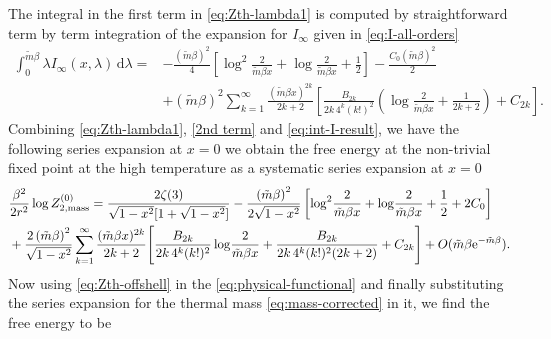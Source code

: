 \documentclass[a4paper,11pt]{article}
\newcommand{\e}{\mathrm e}
\newcommand{\dd}{\mathrm d}
\begin{document}
The integral in the first term in \eqref{eq:Zth-lambda1} is computed by straightforward term by term integration of the expansion for $I_{\infty}$ given in \eqref{eq:I-all-orders}
\begin{align}
\int_0^{\tilde m\beta }\lambda I_\infty(x,\lambda)\,\dd \lambda
 ={}&-\frac{\left(\tilde m\beta\right)^2}{4}
 \left[\log^2\!\frac2{\tilde m\beta x}+\log\!\frac2{\tilde m\beta x}+\frac12\right]
 -\frac{C_0\left(\tilde m\beta\right)^2}{2}
 \nonumber\\
 &+\left(\tilde m\beta\right)^2\sum_{k=1}^{\infty}\frac{(\tilde m\beta x)^{2k}}{2k+2}
 \left[
 \frac{B_{2k}}{2k\,4^k(k!)^2}
 \left(\log\!\frac2{\tilde m\beta x}+\frac1{2k+2}\right)+C_{2k}
 \right].
 \label{eq:int-I-result}
\end{align}
Combining \eqref{eq:Zth-lambda1}, \eqref{2nd term} and \eqref{eq:int-I-result}, 
we have the following series expansion at $x=0$
we obtain the free energy at the non-trivial fixed point at the high temperature as a systematic series expansion at $x=0$ 
\begin{align}
 &\frac{\beta^2}{2r^2}\log Z_{2,{\rm mass}}^{(0)}
 =\frac{2\zeta(3)}{\sqrt{1-x^2}[1+\sqrt{1-x^2}]}
-\frac{\left(\tilde m\beta\right)^2}{2\sqrt{1-x^2}}
 \left[\log^2\!\frac2{\tilde m\beta x}+\log\!\frac2{\tilde m\beta x}+\frac12+2C_0\right]
 \nonumber\\
 &+\frac{2\left(\tilde m\beta\right)^2}{\sqrt{1-x^2}}
 \sum_{k=1}^{\infty}\frac{(\tilde m\beta x)^{2k}}{2k+2}
 \Bigg[
 \frac{B_{2k}}{2k\,4^k(k!)^2}
 \log\!\frac2{\tilde m\beta x}
 +\frac{B_{2k}}{2k\,4^k(k!)^2(2k+2)}
 +C_{2k}
 \Bigg]
 +O(\tilde m\beta\e^{-\tilde m\beta}).
 \label{eq:Zth-offshell}
\end{align}
Now using \eqref{eq:Zth-offshell} in the \eqref{eq:physical-functional} and finally substituting the series expansion for the thermal mass \eqref{eq:mass-corrected} in it, we find the free energy to be 
\end{document}
